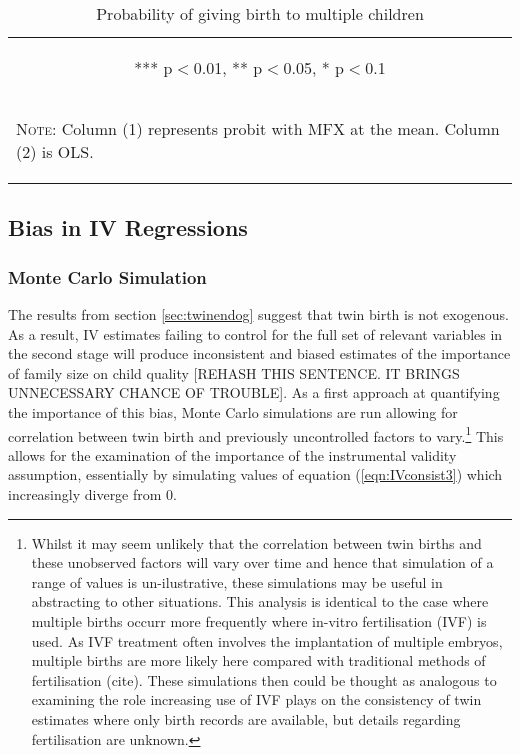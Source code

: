 \documentclass{article}[11pt,subeqn]
\begin{document}
\begin{spacing}{1.25}
\begin{table}[ht]
\begin{center}
\begin{tabular}{lcc}
\multicolumn{3}{c}{\begin{footnotesize}*** p$<$0.01, ** p$<$0.05, * p$<$0.1\end{footnotesize}} \\ 
\multicolumn{3}{p{7.2cm}}{\setstretch{0.9}\begin{footnotesize}\textsc{Note:} Column (1) represents probit with MFX at the mean.  Column
(2) is OLS.\end{footnotesize}}\\
\bottomrule
\end{tabular}
\end{center}
\label{tab:twinreg1}
\caption{Probability of giving birth to multiple children}
\end{table}
\subsection{Bias in IV Regressions}
\subsubsection{Monte Carlo Simulation}
\label{scn:MCS}
The results from section \ref{sec:twinendog} suggest that twin birth is not exogenous. As a result, IV estimates failing to control for the full set of 
relevant variables in the second stage will produce inconsistent and biased estimates of the importance of family size on child quality [REHASH THIS SENTENCE.  IT BRINGS UNNECESSARY CHANCE OF TROUBLE].  As a first approach at quantifying the importance of this bias, Monte Carlo simulations are run allowing for correlation between twin birth and previously uncontrolled factors
to vary.\footnote{Whilst it may seem unlikely that the correlation between twin births and these unobserved factors will vary over time and hence that
simulation of a range of values is un-ilustrative, these simulations may be useful in abstracting to other situations.  This analysis is identical to the
case where multiple births occurr more frequently where in-vitro fertilisation (IVF) is used.  As IVF treatment often involves the implantation of 
multiple embryos, multiple births are more likely here compared with traditional methods of fertilisation (cite).  These simulations then could be 
thought as analogous to examining the role increasing use of IVF plays on the consistency of twin estimates where only birth records are available, 
but details regarding fertilisation are unknown.}  This allows for the examination of the importance of the instrumental validity assumption, essentially
by simulating values of equation (\ref{eqn:IVconsist3}) which increasingly diverge from 0. 


\end{spacing}
\end{document}
